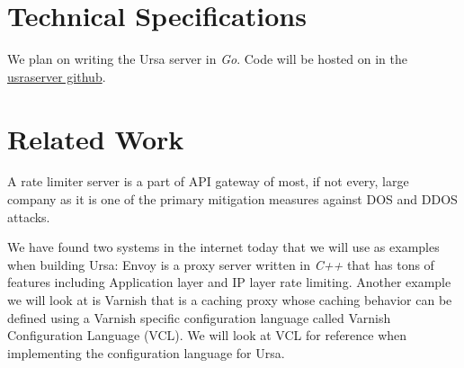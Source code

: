 \documentclass{article}
\begin{document}
%
% 
%
\section{Technical Specifications}
We plan on writing the Ursa server in \textit{Go}. Code will be hosted on
in the \href{https://github.com/ursaserver}{usraserver github}.

%
%
\section{Related Work}
A rate limiter server is a part of API gateway of most, if not every, large
company as it is one of the primary mitigation measures against DOS and DDOS
attacks.

We have found two systems in the internet today that we will use as examples
when building Ursa: Envoy \cite{envoy} is a proxy server written in \textit{C++}
that has tons of features including Application layer and IP layer rate
limiting. Another example we will look at is Varnish \cite{varnish} that is a
caching proxy whose caching behavior can be defined using a Varnish specific
configuration language called Varnish Configuration Language (VCL).  We will
look at VCL for reference when implementing the configuration language for Ursa.

\printbibliography
\end{document}
